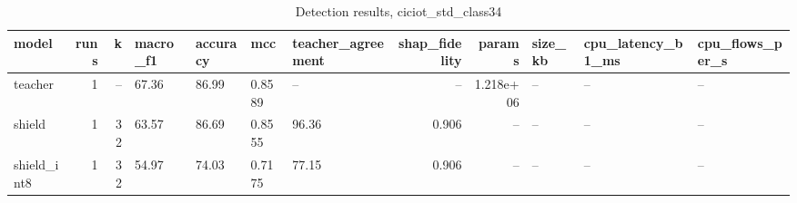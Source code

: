 \begin{table}
\caption{Detection results, ciciot_std_class34}
\begin{tabular}{lrrllllrrlll}
\toprule
model & runs & k & macro_f1 & accuracy & mcc & teacher_agreement & shap_fidelity & params & size_kb & cpu_latency_b1_ms & cpu_flows_per_s \\
\midrule
teacher & 1 & -- & 67.36 & 86.99 & 0.8589 & -- & -- & 1.218e+06 & -- & -- & -- \\
shield & 1 & 32 & 63.57 & 86.69 & 0.8555 & 96.36 & 0.906 & -- & -- & -- & -- \\
shield_int8 & 1 & 32 & 54.97 & 74.03 & 0.7175 & 77.15 & 0.906 & -- & -- & -- & -- \\
\bottomrule
\end{tabular}
\end{table}

